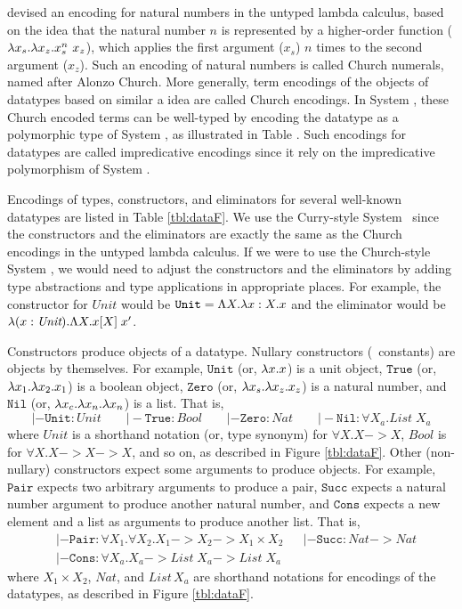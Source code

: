 \citet{Church41} devised an encoding for natural numbers
in the untyped lambda calculus, based on the idea that the natural number $n$
is represented by a higher-order function ($\lambda x_s.\lambda x_z.x_s^n~x_z$), which
applies the first argument ($x_s$) $n$ times to the second argument ($x_z$).
Such an encoding of natural numbers is called Church numerals, named after
Alonzo Church. More generally, term encodings of the objects of datatypes
based on similar a idea are called Church encodings. In System \F,
these Church encoded terms can be well-typed by encoding the datatype
as a polymorphic type of System \F, as illustrated in Table \label{tbl:dataF}.
Such encodings for datatypes are called impredicative encodings
since it rely on the impredicative polymorphism of System \F.

Encodings of types, constructors, and eliminators for
several well-known datatypes are listed in Table \ref{tbl:dataF}.
We use the Curry-style System \F\ since the constructors and the eliminators
are exactly the same as the Church encodings in the untyped lambda calculus.
If we were to use the Church-style System \F, we would need to adjust
the constructors and the eliminators by adding type abstractions and
type applications in appropriate places. For example,
the constructor for $\textit{Unit}$ would be
$\mathtt{Unit} = \Lambda X.\lambda x:X.x$ and the eliminator would be
$\lambda(x:\textit{Unit}).\Lambda X.x[X]\;x'$.

Constructors produce objects of a datatype. Nullary constructors
(\aka\ constants) are objects by themselves. For example,
$\mathtt{Unit}$ (or, $\lambda x.x$) is a unit object,
$\mathtt{True}$ (or, $\lambda x_1.\lambda x_2. x_1$) is a boolean object,
$\mathtt{Zero}$ (or, $\lambda x_s. \lambda x_z. x_z$) is a natural number, and
$\mathtt{Nil}$ (or, $\lambda x_c.\lambda x_n.\lambda x_n$) is a list.
That is,
\[
|- \mathtt{Unit}:\textit{Unit} \qquad
|- \mathtt{True}:\textit{Bool} \qquad
|- \mathtt{Zero}:\textit{Nat} \qquad
|- \mathtt{Nil}:\forall X_a.\textit{List}\;X_a
\]
where $\textit{Unit}$ is a shorthand notation (or, type synonym)
for $\forall X.X -> X$, $Bool$ is for $\forall X.X -> X -> X$, and so on,
as described in Figure \ref{tbl:dataF}.
Other (non-nullary) constructors expect some arguments to produce objects.
For example, $\mathtt{Pair}$ expects two arbitrary arguments to produce a pair,
$\mathtt{Succ}$ expects a natural number argument to produce another
natural number, and $\mathtt{Cons}$ expects a new element and a list as
arguments to produce another list. That is,
\begin{align*}
& |- \mathtt{Pair} : \forall X_1. \forall X_2. X_1 -> X_2 -> X_1\times X_2
&& |- \mathtt{Succ} : \textit{Nat} -> \textit{Nat} \\ &
|- \mathtt{Cons} : \forall X_a. X_a -> \mathit{List}\;X_a -> \mathit{List}\;X_a
\end{align*}
where ${X_1 \times X_2}$, $\mathit{Nat}$, and $\mathit{List\,X_a}$
are shorthand notations for encodings of the datatypes,
as described in Figure \ref{tbl:dataF}.

